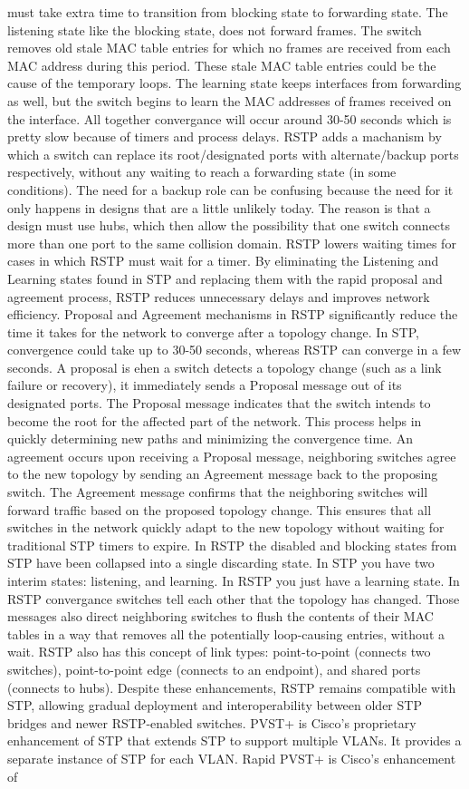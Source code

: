 \documentclass{article}
\begin{document}
\begin{itemize}
must take extra time to transition from blocking state to forwarding state. The listening state like the blocking state, does not forward frames. The switch removes old stale MAC table entries for which no frames are received from each MAC address during this period. These stale MAC table entries could be the cause of the temporary loops. The learning state keeps interfaces from forwarding as well, but the switch begins to learn the MAC addresses of frames received on the interface. All together convergance will occur around 30-50 seconds which is pretty slow because of timers and process delays. RSTP adds a machanism by which a switch can replace its root/designated ports with alternate/backup ports respectively, without any waiting to reach a forwarding state (in some conditions). The need for a backup role can be confusing because the need for it only happens in designs that are a little unlikely today. The reason is that a design must use hubs, which then allow the possibility that one switch connects more than one port to the same collision domain. RSTP lowers waiting times for cases in which RSTP must wait for a timer. By eliminating the Listening and Learning states found in STP and replacing them with the rapid proposal and agreement process, RSTP reduces unnecessary delays and improves network efficiency. Proposal and Agreement mechanisms in RSTP significantly reduce the time it takes for the network to converge after a topology change. In STP, convergence could take up to 30-50 seconds, whereas RSTP can converge in a few seconds. A proposal is ehen a switch detects a topology change (such as a link failure or recovery), it immediately sends a Proposal message out of its designated ports. The Proposal message indicates that the switch intends to become the root for the affected part of the network. This process helps in quickly determining new paths and minimizing the convergence time. An agreement occurs upon receiving a Proposal message, neighboring switches agree to the new topology by sending an Agreement message back to the proposing switch. The Agreement message confirms that the neighboring switches will forward traffic based on the proposed topology change. This ensures that all switches in the network quickly adapt to the new topology without waiting for traditional STP timers to expire. In RSTP the disabled and blocking states from STP have been collapsed into a single discarding state. In STP you have two interim states: listening, and learning. In RSTP you just have a learning state. In RSTP convergance switches tell each other that the topology has changed. Those messages also direct neighboring switches to flush the contents of their MAC tables in a way that removes all the potentially loop-causing entries, without a wait. RSTP also has this concept of link types: point-to-point (connects two switches), point-to-point edge (connects to an endpoint), and shared ports (connects to hubs). Despite these enhancements, RSTP remains compatible with STP, allowing gradual deployment and interoperability between older STP bridges and newer RSTP-enabled switches. PVST+ is Cisco's proprietary enhancement of STP that extends STP to support multiple VLANs. It provides a separate instance of STP for each VLAN. Rapid PVST+ is Cisco's enhancement of 
\end{itemize}
\end{document}

